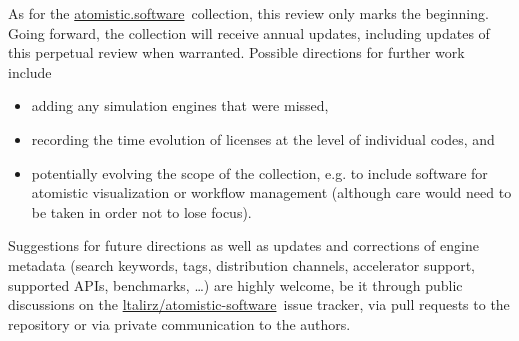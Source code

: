 \documentclass[9pt,review]{livecoms}
\newcommand{\atsoft}{\href{https://atomistic.software}{atomistic.software}\ }
\newcommand{\atsoftgit}{\href{https://github.com/ltalirz/atomistic-software}{ltalirz/atomistic-software}\ }
\begin{document}
As for the \atsoft collection, this review only marks the beginning.
Going forward, the collection will receive annual updates, including updates of this perpetual review when warranted.
Possible directions for further work include
\begin{itemize}
    \item 
adding any simulation engines that were missed, 
    \item 
recording the time evolution of licenses at the level of individual codes, and
    \item 
potentially evolving the scope of the collection, e.g. to include software for atomistic visualization or workflow management (although care would need to be taken in order not to lose focus).
\end{itemize}
Suggestions for future directions as well as updates and corrections of engine metadata (search keywords, tags, distribution channels, accelerator support, supported APIs, benchmarks, \ldots) are highly welcome,
be it through public discussions on the \atsoftgit issue tracker, via pull requests to the repository or via private communication to the authors.








\end{document}
